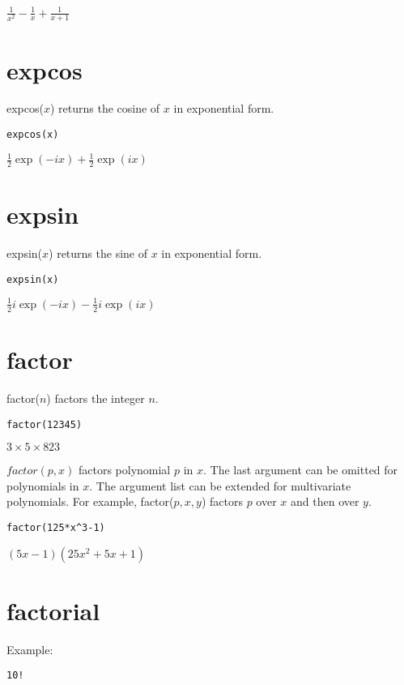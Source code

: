 $\displaystyle \frac{1}{x^2}-\frac{1}{x}+\frac{1}{x+1}$

\section*{expcos}
expcos($x$) returns the cosine of $x$ in exponential form.

\begin{Verbatim}[formatcom=\color{blue},samepage=true]
expcos(x)
\end{Verbatim}

$\displaystyle \frac{1}{2}\exp(-ix)+\frac{1}{2}\exp(ix)$

\section*{expsin}
expsin($x$) returns the sine of $x$ in exponential form.

\begin{Verbatim}[formatcom=\color{blue},samepage=true]
expsin(x)
\end{Verbatim}

$\displaystyle \frac{1}{2}i\exp(-ix)-\frac{1}{2}i\exp(ix)$

\section*{factor}
factor($n$) factors the integer $n$.

\begin{Verbatim}[formatcom=\color{blue},samepage=true]
factor(12345)
\end{Verbatim}

$\displaystyle 3\times 5\times 823$

$factor(p,x)$ factors polynomial $p$ in $x$.
The last argument can be omitted for polynomials in $x$.
The argument list can be extended for multivariate polynomials.
For example, factor($p,x,y$) factors $p$ over $x$ and then over $y$.

\begin{Verbatim}[formatcom=\color{blue},samepage=true]
factor(125*x^3-1)
\end{Verbatim}

$\displaystyle (5x-1)(25x^2+5x+1)$

\section*{factorial}
Example:

\begin{Verbatim}[formatcom=\color{blue},samepage=true]
10!
\end{Verbatim}

